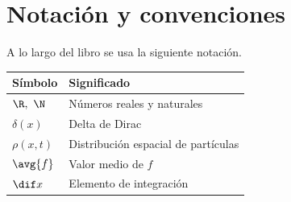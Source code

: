 \chapter*{Notación y convenciones}

A lo largo del libro se usa la siguiente notación.

\bigskip

\begin{tabular}{@{}p{3cm}p{9cm}@{}}
\toprule
\textbf{Símbolo} & \textbf{Significado} \\
\midrule
$\R,\ \N$ & Números reales y naturales \\
$\delta(x)$ & Delta de Dirac \\
$\rho(x,t)$ & Distribución espacial de partículas \\
$\avg{f}$ & Valor medio de $f$ \\
$\dif x$ & Elemento de integración \\
\bottomrule
\end{tabular}
